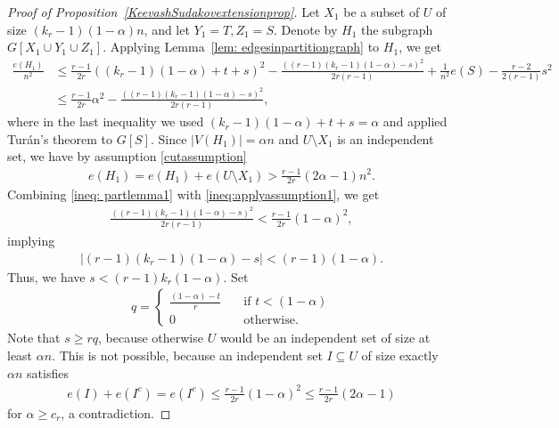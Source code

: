 \documentclass[11pt]{article}
\theoremstyle{definition}
\numberwithin{theo}{section}
\begin{document}
\begin{proof}[Proof of Proposition~\ref{KeevashSudakovextensionprop}]
Let $X_1$ be a subset of $U$ of size $(k_r-1)(1-\alpha)n$, and let $Y_1=T,Z_1=S$. Denote by $H_1$ the subgraph $G[X_1 \cup Y_1 \cup Z_1]$. Applying Lemma~\ref{lem: edgesinpartitiongraph} to $H_1$, we get
\begin{align}
\label{ineq: partlemma1}
\nonumber
    \frac{e(H_1)}{n^2}&\leq \frac{r-1}{2r}((k_r-1)(1-\alpha)+t+s)^2-\frac{((r-1)(k_r-1)(1-\alpha)-s)^2}{2r(r-1)}+\frac{1}{n^2}e(S)-\frac{r-2}{2(r-1)}s^2\\
    &\leq \frac{r-1}{2r}\alpha^2-\frac{((r-1)(k_r-1)(1-\alpha)-s)^2}{2r(r-1)},
\end{align}
where in the last inequality we used $(k_r-1)(1-\alpha)+t+s=\alpha$ and applied Tur\'an's theorem to $G[S]$. Since $|V(H_1)|=\alpha n$ and $U\setminus X_1$ is an independent set, we have by assumption \eqref{cutassumption}
\begin{align}
\label{ineq:applyassumption1}
    e(H_1)=e(H_1)+e(U\setminus X_1)> \frac{r-1}{2r}(2\alpha-1)n^2.
\end{align}
Combining \eqref{ineq: partlemma1} with \eqref{ineq:applyassumption1}, we get
\begin{align*}
   \frac{((r-1)(k_r-1)(1-\alpha)-s)^2}{2r(r-1)}< \frac{r-1}{2r}(1-\alpha)^2,
\end{align*}
implying
\begin{align*}
    \lvert(r-1)(k_r-1)(1-\alpha)-s\rvert< (r-1)(1-\alpha).
\end{align*}
Thus, we have $s< (r-1)k_r(1-\alpha)$. Set 
\begin{align*}
 q =
\begin{cases}
\frac{(1-\alpha)-t}{r} & \quad \text{if } t < (1-\alpha) \\
0 & \quad \text{otherwise}.
\end{cases}
\end{align*}
Note that $s\geq rq$, because otherwise $U$ would be an independent set of size at least $\alpha n$. This is not possible, because an independent set  $I\subseteq U$ of size exactly $\alpha n$ satisfies
\begin{align*}
    e(I)+e(I^c)=e(I^c)\leq \frac{r-1}{2r}(1-\alpha)^2\leq \frac{r-1}{2r}(2\alpha-1)
\end{align*}
for $\alpha\geq c_r$, a contradiction.  


\end{proof}
\end{document}
